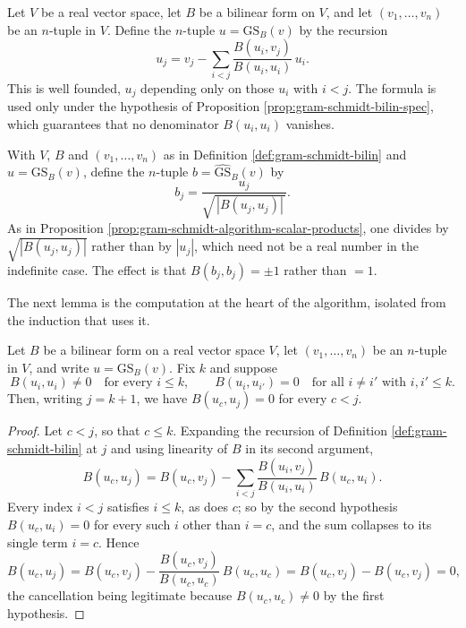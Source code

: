 \begin{definition}
\label{def:gram-schmidt-bilin}
\leanok
Let $V$ be a real vector space, let $B$ be a bilinear form on $V$, and let $(v_1,\ldots,v_n)$ be an $n$-tuple in $V$. Define the $n$-tuple $u = \mathrm{GS}_B(v)$ by the recursion
\[
u_j = v_j - \sum_{i < j} \frac{B(u_i, v_j)}{B(u_i,u_i)} \, u_i .
\]
This is well founded, $u_j$ depending only on those $u_i$ with $i < j$. The formula is used only under the hypothesis of Proposition \ref{prop:gram-schmidt-bilin-spec}, which guarantees that no denominator $B(u_i,u_i)$ vanishes.
\end{definition}

\begin{definition}
\label{def:gram-schmidt-bilin-normed}
\leanok
{}
With $V$, $B$ and $(v_1,\ldots,v_n)$ as in Definition \ref{def:gram-schmidt-bilin} and $u = \mathrm{GS}_B(v)$, define the $n$-tuple $b = \widehat{\mathrm{GS}}_B(v)$ by
\[
b_j = \frac{u_j}{\sqrt{\,|B(u_j,u_j)|\,}} .
\]
As in Proposition \ref{prop:gram-schmidt-algorithm-scalar-products}, one divides by $\sqrt{|B(u_j,u_j)|}$ rather than by $|u_j|$, which need not be a real number in the indefinite case. The effect is that $B(b_j,b_j) = \pm 1$ rather than $= 1$.
\end{definition}

The next lemma is the computation at the heart of the algorithm, isolated from the induction that uses it.

\begin{lemma}
\label{lem:gram-schmidt-bilin-orthogonal-earlier}
\leanok
{}
Let $B$ be a bilinear form on a real vector space $V$, let $(v_1,\ldots,v_n)$ be an $n$-tuple in $V$, and write $u = \mathrm{GS}_B(v)$. Fix $k$ and suppose
\[
B(u_i,u_i) \neq 0 \quad\text{for every } i \leq k, \qquad B(u_i,u_{i'}) = 0 \quad\text{for all } i \neq i' \text{ with } i,i' \leq k .
\]
Then, writing $j = k+1$, we have $B(u_c, u_j) = 0$ for every $c < j$.
\end{lemma}

\begin{proof}
\leanok
{}
Let $c < j$, so that $c \leq k$. Expanding the recursion of Definition \ref{def:gram-schmidt-bilin} at $j$ and using linearity of $B$ in its second argument,
\[
B(u_c, u_j) = B(u_c, v_j) - \sum_{i < j} \frac{B(u_i,v_j)}{B(u_i,u_i)} \, B(u_c, u_i) .
\]
Every index $i < j$ satisfies $i \leq k$, as does $c$; so by the second hypothesis $B(u_c,u_i) = 0$ for every such $i$ other than $i = c$, and the sum collapses to its single term $i = c$. Hence
\[
B(u_c,u_j) = B(u_c,v_j) - \frac{B(u_c,v_j)}{B(u_c,u_c)}\, B(u_c,u_c) = B(u_c,v_j) - B(u_c,v_j) = 0 ,
\]
the cancellation being legitimate because $B(u_c,u_c) \neq 0$ by the first hypothesis.
\end{proof}

